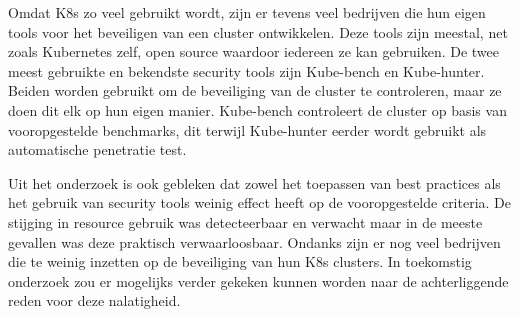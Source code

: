 Omdat K8s zo veel gebruikt wordt, zijn er tevens veel bedrijven die hun eigen tools voor het beveiligen van een cluster ontwikkelen. Deze tools zijn meestal, net zoals Kubernetes zelf, open source waardoor iedereen ze kan gebruiken. De twee meest gebruikte en bekendste security tools zijn Kube-bench en Kube-hunter. Beiden worden gebruikt om de beveiliging van de cluster te controleren, maar ze doen dit elk op hun eigen manier. Kube-bench controleert de cluster op basis van vooropgestelde benchmarks, dit terwijl Kube-hunter eerder wordt gebruikt als automatische penetratie test.

Uit het onderzoek is ook gebleken dat zowel het toepassen van best practices als het gebruik van security tools weinig effect heeft op de vooropgestelde criteria. De stijging in resource gebruik was detecteerbaar en verwacht maar in de meeste gevallen was deze praktisch verwaarloosbaar. Ondanks zijn er nog veel bedrijven die te weinig inzetten op de beveiliging van hun K8s clusters. In toekomstig onderzoek zou er mogelijks verder gekeken kunnen worden naar de achterliggende reden voor deze nalatigheid.  
